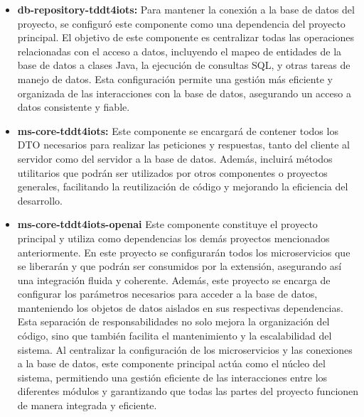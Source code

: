 \begin{itemize}
	\item \textbf{db-repository-tddt4iots: } Para mantener la conexión a la base de datos del proyecto, se configuró este componente como una dependencia del proyecto principal. El objetivo de este componente es centralizar todas las operaciones relacionadas con el acceso a datos, incluyendo el mapeo de entidades de la base de datos a clases Java, la ejecución de consultas SQL, y otras tareas de manejo de datos. Esta configuración permite una gestión más eficiente y organizada de las interacciones con la base de datos, asegurando un acceso a datos consistente y fiable.
	
	\item \textbf{ms-core-tddt4iots: } Este componente se encargará de contener todos los DTO necesarios para realizar las peticiones y respuestas, tanto del cliente al servidor como del servidor a la base de datos. Además, incluirá métodos utilitarios que podrán ser utilizados por otros componentes o proyectos generales, facilitando la reutilización de código y mejorando la eficiencia del desarrollo.
	
	\item \textbf{ms-core-tddt4iots-openai} Este componente constituye el proyecto principal y utiliza como dependencias los demás proyectos mencionados anteriormente. En este proyecto se configurarán todos los microservicios que se liberarán y que podrán ser consumidos por la extensión, asegurando así una integración fluida y coherente. Además, este proyecto se encarga de configurar los parámetros necesarios para acceder a la base de datos, manteniendo los objetos de datos aislados en sus respectivas dependencias. Esta separación de responsabilidades no solo mejora la organización del código, sino que también facilita el mantenimiento y la escalabilidad del sistema. Al centralizar la configuración de los microservicios y las conexiones a la base de datos, este componente principal actúa como el núcleo del sistema, permitiendo una gestión eficiente de las interacciones entre los diferentes módulos y garantizando que todas las partes del proyecto funcionen de manera integrada y eficiente. 
	

\end{itemize}
